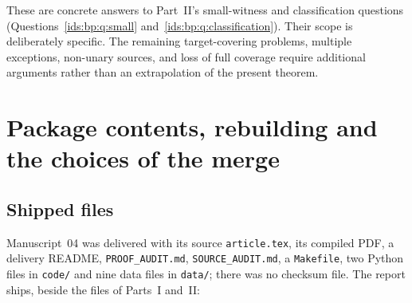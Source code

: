 \documentclass[11pt,letterpaper]{article}
\theoremstyle{definition}\newtheorem{definition}[theorem]{Definition}
\theoremstyle{remark}\newtheorem{remark}[theorem]{Remark}
\theoremstyle{definition}\newtheorem{question}[theorem]{Question}
\begin{document}
These are concrete answers to Part~II's small-witness and
classification questions (Questions~\ref{ids:bp:q:small}
and~\ref{ids:bp:q:classification}). Their scope is deliberately specific. The
remaining target-covering problems, multiple exceptions, non-unary sources,
and loss of full coverage require additional arguments rather than an
extrapolation of the present theorem.


\section{Package contents, rebuilding and the choices of the merge}
\label{ids:si:sec:package}

\subsection{Shipped files}\label{ids:si:sec:files}
Manuscript~04 was delivered with its source \texttt{article.tex}, its compiled
PDF, a delivery README, \texttt{PROOF\_AUDIT.md}, \texttt{SOURCE\_AUDIT.md}, a
\texttt{Makefile}, two Python files in \texttt{code/} and nine data files in
\texttt{data/}; there was no checksum file. The report ships, beside the files
of Parts~I and~II:
\end{document}
